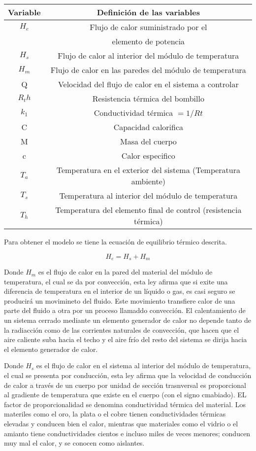 \documentclass[letter,operight,12pt,spanish]{report}
\begin{document}
\begin{tabular}{|c|c|}
\hline
	Variable & Definici\'on de las variables\\
\hline
	$H_e$ & Flujo de calor suministrado por el\\  & elemento de potencia\\ 
\hline
$H_s$ & Flujo de calor al interior del m\'odulo de temperatura\\
\hline
$H_m$ & Flujo de calor en las paredes del m\'odulo de temperatura\\
\hline
	Q & Velocidad del flujo de calor en el sistema a controlar\\
\hline
 $R_th$ & Resistencia t\'ermica del bombillo\\
\hline
	$k_1$ & Conductividad t\'ermica $=1/Rt$\\
\hline
	C & Capacidad calorifica\\
\hline
	M & Masa del cuerpo\\
\hline
	c & Calor especifico\\
\hline
	$T_a$ & Temperatura en el exterior del sistema (Temperatura ambiente)\\
\hline
	$T_s$ & Temperatura al interior del m\'odulo de temperatura\\
\hline
$T_h$ & Temperatura del elemento final de control (resistencia t\'ermica)\\
\hline
\end{tabular}

Para obtener el modelo se tiene la ecuaci\'on de equilibrio t\'ermico descrita.

\begin{equation}
H_e=H_s+H_m
\end{equation}

Donde $H_m$ es el flujo de calor en la pared del material del m\'odulo de temperatura, el cual se da por convecci\'on, esta ley afirma que si exite una diferencia de temperatura en el interior de un l\'iquido o gas, es casi seguro se producir\'a un movimineto del fluido. Este movimiento transfiere calor de una parte del fluido a otra por un proceso llamaddo convecci\'on. El calentamiento de un sistema cerrado mediante un elemento generador de calor no depende tanto de la radiacci\'on como de las corrientes naturales de convecci\'on, que hacen que el aire caliente suba hacia el techo y el aire fr\'io del resto del sistema se dirija hacia el elemento generador de calor.

Donde $H_s$ es el flujo de calor en el sistema al interior del m\'odulo de temperatura, el cual se presenta por conducci\'on, esta ley afirma que la velocidad de conducci\'on de calor a trav\'es de un cuerpo por unidad de secci\'on trasnversal es proporcional al gradiente de temperatura que existe en el cuerpo (con el signo cmabiado). EL factor de proporcionalidad se denomina conductividad t\'ermica del material. Los materiles como el oro, la plata o el cobre tienen conductividades t\'ermicas elevadas y conducen bien el calor, mientras que materiales como el vidrio o el amianto tiene conductividades cientos e incluso miles de veces menores; conducen muy mal el calor, y se conocen como aislantes.
\end{document}
